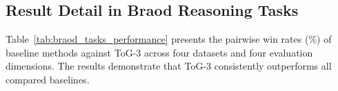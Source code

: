 \subsection{Result Detail in Braod Reasoning Tasks}
Table~\ref{tab:braod_tasks_performance} presents the pairwise win rates (\%) of baseline methods against ToG-3 across four datasets and four evaluation dimensions. The results demonstrate that ToG-3 consistently outperforms all compared baselines.


\begin{table}[t]
\centering
\caption{Win rates (\%) of baselines v.s. ToG-3 across four datasets and four evaluation dimensions. The better results of each dataset are marked in \textbf{bold}.}
\label{tab:braod_tasks_performance}
\vspace{-0.1in}
\end{table}
